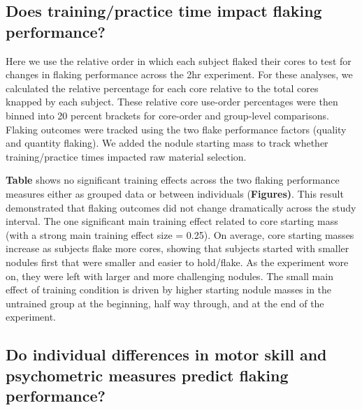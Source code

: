 \documentclass[smallextended]{svjour3}       %
\begin{document}
\hypertarget{does-trainingpractice-time-impact-flaking-performance}{%
\subsection{\texorpdfstring{\textbf{Does training/practice time impact
flaking
performance?}}{Does training/practice time impact flaking performance?}}\label{does-trainingpractice-time-impact-flaking-performance}}

Here we use the relative order in which each subject flaked their cores
to test for changes in flaking performance across the 2hr experiment.
For these analyses, we calculated the relative percentage for each core
relative to the total cores knapped by each subject. These relative core
use-order percentages were then binned into 20 percent brackets for
core-order and group-level comparisons. Flaking outcomes were tracked
using the two flake performance factors (quality and quantity flaking).
We added the nodule starting mass to track whether training/practice
times impacted raw material selection.

\textbf{Table} shows no significant training effects across the two
flaking performance measures either as grouped data or between
individuals (\textbf{Figures)}. This result demonstrated that flaking
outcomes did not change dramatically across the study interval. The one
significant main training effect related to core starting mass (with a
strong main training effect size = 0.25). On average, core starting
masses increase as subjects flake more cores, showing that subjects
started with smaller nodules first that were smaller and easier to
hold/flake. As the experiment wore on, they were left with larger and
more challenging nodules. The small main effect of training condition is
driven by higher starting nodule masses in the untrained group at the
beginning, half way through, and at the end of the experiment.~

\hypertarget{do-individual-differences-in-motor-skill-and-psychometric-measures-predict-flaking-performance}{%
\subsection{\texorpdfstring{\textbf{Do individual differences in motor
skill and psychometric measures predict flaking
performance?}}{Do individual differences in motor skill and psychometric measures predict flaking performance?}}\label{do-individual-differences-in-motor-skill-and-psychometric-measures-predict-flaking-performance}}
\end{document}
